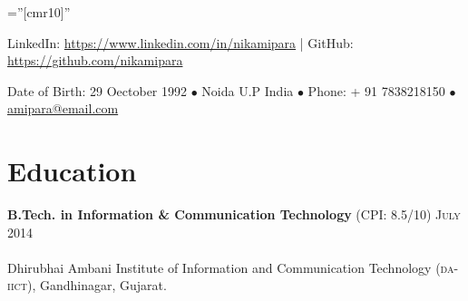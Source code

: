 \documentclass[letterpaper,11pt]{article}
\begin{document}
\pagestyle{empty} %

\font\fb=''[cmr10]'' %


\par{\par} %
\par{\centering LinkedIn: \href{https://www.linkedin.com/in/nikamipara}{https://www.linkedin.com/in/nikamipara} | GitHub: \href{https://github.com/nikamipara}{https://github.com/nikamipara}\par}
\par{\centering Date of Birth: 29 Oectober 1992 $\bullet$ Noida U.P India $\bullet$ Phone: + 91 7838218150 $\bullet$ \href{mailto:amipara@email.com}{amipara@email.com}\par  }

\section{Education}

\textbf{B.Tech. in Information \& Communication Technology} \normalsize (\textsc{CPI:} 8.5/10) \hfill{\textsc{July} 2014 }\\[-3mm]\\
\normalsize\small Dhirubhai Ambani Institute of Information and Communication Technology (\textsc{da-iict}), Gandhinagar, Gujarat.\\
\end{document}
